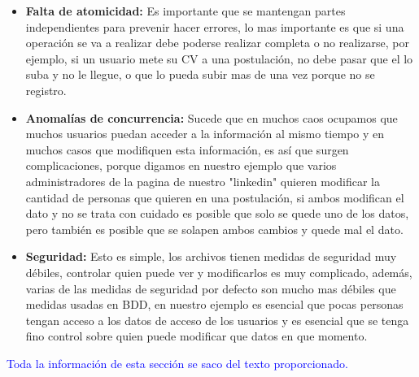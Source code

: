\begin{itemize}
    \item \textbf{Falta de atomicidad:} Es importante que se mantengan partes independientes para prevenir hacer errores, lo mas importante es que si una operación se va a realizar debe poderse realizar completa o no realizarse, por ejemplo, si un usuario mete su CV a una postulación, no debe pasar que el lo suba y no le llegue, o que lo pueda subir mas de una vez porque no se registro.\\
    \item \textbf{Anomalías de concurrencia:} Sucede que en muchos caos ocupamos que muchos usuarios puedan acceder a la información al mismo tiempo y en muchos casos que modifiquen esta información, es así que surgen complicaciones, porque digamos en nuestro ejemplo que varios administradores de la pagina de nuestro "linkedin" quieren modificar la cantidad de personas que quieren en una postulación, si ambos modifican el dato y no se trata con cuidado es posible que solo se quede uno de los datos, pero también es posible que se solapen ambos cambios y quede mal el dato.\\
    \item \textbf{Seguridad:} Esto es simple, los archivos tienen medidas de seguridad muy débiles, controlar quien puede ver y modificarlos es muy complicado, además, varias de las medidas de seguridad por defecto son mucho mas débiles que medidas usadas en BDD, en nuestro ejemplo es esencial que pocas personas tengan acceso a los datos de acceso de los usuarios y es esencial que se tenga fino control sobre quien puede modificar que datos en que momento.
\end{itemize}

\textcolor{blue}{Toda la información de esta sección se saco del texto proporcionado. \cite{PuprposeOfDBS}}